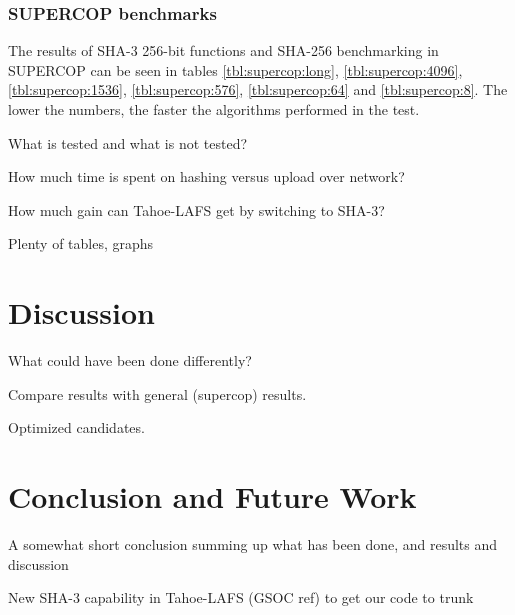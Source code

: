 \documentclass[english,12pt,a4paper]{book}
\begin{document}
\subsection{\ac{SUPERCOP} benchmarks}
The results of \ac{SHA}-3
256-bit functions and \ac{SHA}-256 benchmarking in \ac{SUPERCOP} can be seen in
tables \ref{tbl:supercop:long}, \ref{tbl:supercop:4096},
\ref{tbl:supercop:1536}, \ref{tbl:supercop:576}, \ref{tbl:supercop:64} and
\ref{tbl:supercop:8}. The lower the numbers, the faster the algorithms
performed in the test.








What is tested and what is not tested?

How much time is spent on hashing versus upload over network?

How much gain can Tahoe-LAFS get by switching to SHA-3?

Plenty of tables, graphs

\chapter{Discussion}

What could have been done differently?

Compare results with general (supercop) results.

Optimized candidates.

\chapter{Conclusion and Future Work}

A somewhat short conclusion summing up what has been done, and results and
discussion

New SHA-3 capability in Tahoe-LAFS (GSOC ref) to get our code to trunk






\end{document}
